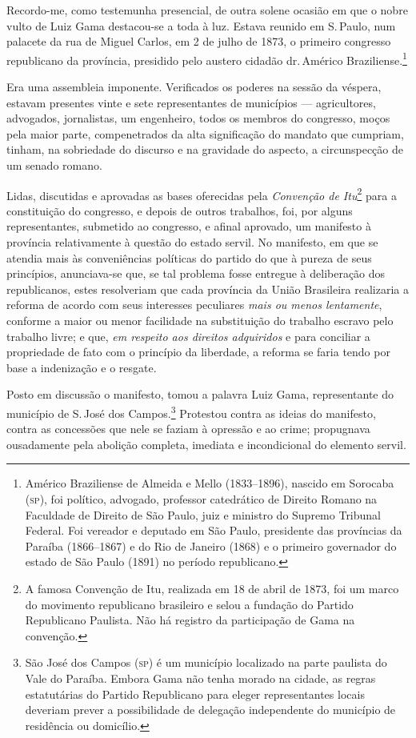 Recordo-me, como testemunha presencial, de outra solene ocasião em que o
nobre vulto de Luiz Gama destacou-se a toda à luz. Estava reunido em S.\,Paulo, num palacete da rua de Miguel Carlos, em 2 de julho de 1873, o
primeiro congresso republicano da província, presidido pelo austero
cidadão dr.\,Américo Braziliense.\footnote{Américo Braziliense de
  Almeida e Mello (1833--1896), nascido em Sorocaba (\textsc{sp}), foi político,
  advogado, professor catedrático de Direito Romano na Faculdade de
  Direito de São Paulo, juiz e ministro do Supremo Tribunal Federal. Foi 
  vereador e deputado em São Paulo, presidente das províncias da Paraíba
  (1866--1867) e do Rio de Janeiro (1868) e o primeiro governador do
  estado de São Paulo (1891) no período republicano.}

Era uma assembleia imponente. Verificados os poderes na sessão da
véspera, estavam presentes vinte e sete representantes de municípios
--- agricultores, advogados, jornalistas, um engenheiro, todos os
membros do congresso, moços pela maior parte, compenetrados da alta
significação do mandato que cumpriam, tinham, na sobriedade do discurso
e na gravidade do aspecto, a circunspecção de um senado romano.

Lidas, discutidas e aprovadas as bases oferecidas pela \emph{Convenção
de Itu}\footnote{A famosa Convenção de Itu, realizada em 18 de abril
  de 1873, foi um marco do movimento republicano brasileiro e selou a
  fundação do Partido Republicano Paulista. Não há registro da
  participação de Gama na convenção.} para a constituição do congresso,
e depois de outros trabalhos, foi, por alguns representantes, submetido
ao congresso, e afinal aprovado, um manifesto à província relativamente
à questão do estado servil. No manifesto, em que se atendia mais às
conveniências políticas do partido do que à pureza de seus princípios,
anunciava-se que, se tal problema fosse entregue à deliberação dos
republicanos, estes resolveriam que cada província da União Brasileira
realizaria a reforma de acordo com seus interesses peculiares \emph{mais
ou menos lentamente}, conforme a maior ou menor facilidade na
substituição do trabalho escravo pelo trabalho livre; e que, \emph{em
respeito aos direitos adquiridos} e para conciliar a propriedade de fato
com o princípio da liberdade, a reforma se faria tendo por base a
indenização e o resgate.

Posto em discussão o manifesto, tomou a palavra Luiz Gama, representante
do município de S.\,José dos Campos.\footnote{São José dos Campos (\textsc{sp})
  é um município localizado na parte paulista do Vale do Paraíba. Embora
  Gama não tenha morado na cidade, as regras estatutárias do Partido
  Republicano para eleger representantes locais deveriam prever a
  possibilidade de delegação independente do município de residência ou
  domicílio.} Protestou contra as ideias do manifesto, contra as
concessões que nele se faziam à opressão e ao crime; propugnava
ousadamente pela abolição completa, imediata e incondicional do elemento
servil.

